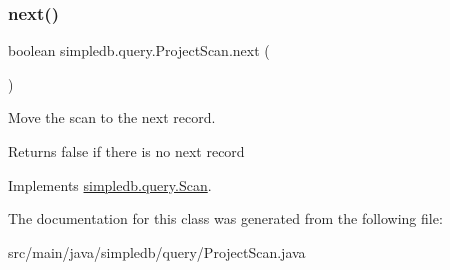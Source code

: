 \subsubsection{\texorpdfstring{next()}{next()}}
{\footnotesize\ttfamily boolean simpledb.\+query.\+Project\+Scan.\+next (\begin{DoxyParamCaption}{ }\end{DoxyParamCaption})\hspace{0.3cm}{\ttfamily [inline]}}

Move the scan to the next record. \begin{DoxyReturn}{Returns}
false if there is no next record 
\end{DoxyReturn}


Implements \hyperlink{interfacesimpledb_1_1query_1_1Scan_a5fc77b7c76d91f89f6c09ac4f15ef351}{simpledb.\+query.\+Scan}.



The documentation for this class was generated from the following file\+:\begin{DoxyCompactItemize}
\item 
src/main/java/simpledb/query/Project\+Scan.\+java\end{DoxyCompactItemize}
